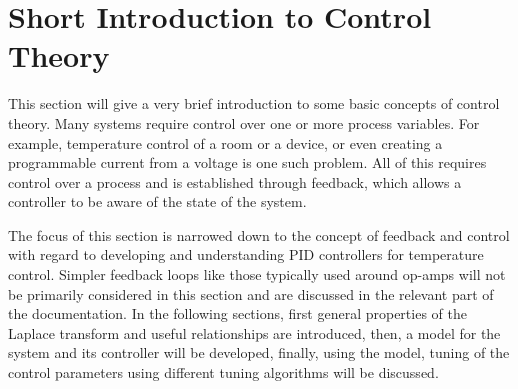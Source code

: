 
\clearpage
\section{Short Introduction to Control Theory}
This section will give a very brief introduction to some basic concepts of control theory. Many systems require control over one or more process variables. For example, temperature control of a room or a device, or even creating a programmable current from a voltage is one such problem. All of this requires control over a process and is established through feedback, which allows a controller to be aware of the state of the system.

The focus of this section is narrowed down to the concept of feedback and control with regard to developing and understanding PID controllers for temperature control. Simpler feedback loops like those typically used around op-amps will not be primarily considered in this section and are discussed in the relevant part of the documentation. In the following sections, first general properties of the Laplace transform and useful relationships are introduced, then, a model for the system and its controller will be developed, finally, using the model, tuning of the control parameters using different tuning algorithms will be discussed.


